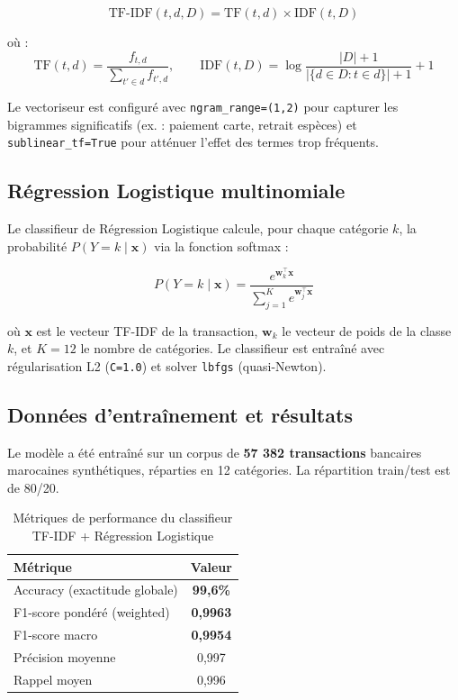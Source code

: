 \documentclass[12pt,a4paper]{report}
\begin{document}
\[
  \mathrm{TF\text{-}IDF}(t, d, D) = \mathrm{TF}(t, d) \times \mathrm{IDF}(t, D)
\]

où :
\[
  \mathrm{TF}(t, d) = \frac{f_{t,d}}{\sum_{t' \in d} f_{t',d}}, \qquad
  \mathrm{IDF}(t, D) = \log\frac{|D| + 1}{|\{d \in D : t \in d\}| + 1} + 1
\]

Le vectoriseur est configuré avec \texttt{ngram\_range=(1,2)} pour capturer
les bigrammes significatifs (ex. : \og{}paiement carte\fg{}, \og{}retrait espèces\fg{})
et \texttt{sublinear\_tf=True} pour atténuer l'effet des termes trop fréquents.

\subsection{Régression Logistique multinomiale}

Le classifieur de Régression Logistique calcule, pour chaque catégorie \(k\),
la probabilité \(P(Y=k \mid \mathbf{x})\) via la fonction softmax :

\[
  P(Y=k \mid \mathbf{x}) = \frac{e^{\mathbf{w}_k^\top \mathbf{x}}}
  {\sum_{j=1}^{K} e^{\mathbf{w}_j^\top \mathbf{x}}}
\]

où \(\mathbf{x}\) est le vecteur TF-IDF de la transaction, \(\mathbf{w}_k\)
le vecteur de poids de la classe \(k\), et \(K = 12\) le nombre de catégories.
Le classifieur est entraîné avec régularisation L2 (\texttt{C=1.0}) et
solver \texttt{lbfgs} (quasi-Newton).

\subsection{Données d'entraînement et résultats}

Le modèle a été entraîné sur un corpus de \textbf{57 382 transactions} bancaires
marocaines synthétiques, réparties en 12 catégories. La répartition train/test
est de 80/20.

\begin{table}[H]
  \centering
  \caption{Métriques de performance du classifieur TF-IDF + Régression Logistique}
  \label{tab:metrics-lr}
  \renewcommand{\arraystretch}{1.3}
  \begin{tabular}{lc}
    \toprule
    Métrique & Valeur \\
    \midrule
    Accuracy (exactitude globale) & \textbf{99,6\%} \\
    F1-score pondéré (weighted) & \textbf{0,9963} \\
    F1-score macro & \textbf{0,9954} \\
    Précision moyenne & 0,997 \\
    Rappel moyen & 0,996 \\
    \bottomrule
  \end{tabular}
\end{table}
\end{document}
